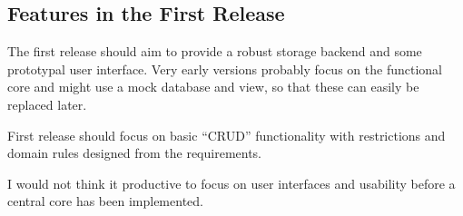 \subsection{Features in the First Release}

The first release should aim to provide a robust storage backend and some
prototypal user interface. Very early versions probably focus on the functional
core and might use a mock database and view, so that these can easily be
replaced later.

First release should focus on basic ``CRUD'' functionality with restrictions
and domain rules designed from the requirements.

I would not think it productive to focus on user interfaces and usability
before a central core has been implemented.
